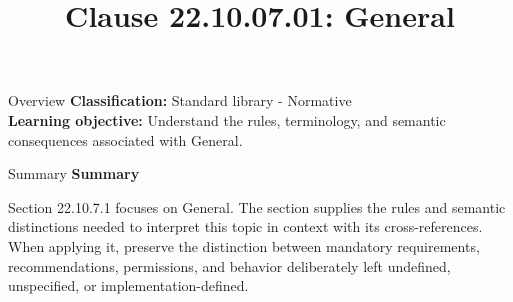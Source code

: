 \documentclass[10pt,letterpaper]{article}
\title{Clause 22.10.07.01: General}
\author{}
\date{}
\begin{document}
\maketitle
\begin{CornellOverviewBox}{Overview}
\textbf{Classification:} Standard library - Normative\\[2pt]
\textbf{Learning objective:} Understand the rules, terminology, and semantic consequences associated with General.
\end{CornellOverviewBox}\begin{CornellSummaryBox}{Summary}
{\sffamily\bfseries\color{Accent} Summary}\par\vspace{3pt}Section 22.10.7.1 focuses on General. The section supplies the rules and semantic distinctions needed to interpret this topic in context with its cross-references. When applying it, preserve the distinction between mandatory requirements, recommendations, permissions, and behavior deliberately left undefined, unspecified, or implementation-defined.
\end{CornellSummaryBox}
\end{document}
